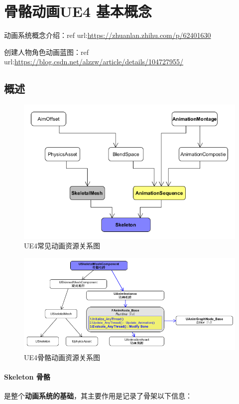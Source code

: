 \documentclass[UTF8,a4paper,12pt]{ctexbook}
\begin{document}
	\section{骨骼动画UE4 基本概念}
			动画系统概念介绍：ref url:\url{https://zhuanlan.zhihu.com/p/62401630}
			
			创建人物角色动画蓝图：ref url:\url{https://blog.csdn.net/alzzw/article/details/104727955/}
			
		\subsection{概述}
			\begin{figure}[H]
				\centering
				\includegraphics[width=.9\linewidth]{Anim_datas}
				\caption{UE4常见动画资源关系图}
			\end{figure}


			\begin{figure}[H]
				\centering
				\includegraphics[width=.9\linewidth]{Anim_datas01}
				\caption{UE4骨骼动画资源关系图}
			\end{figure}		
		
			\paragraph{Skeleton 骨骼}
				是整个\textbf{动画系统的基础}，其主要作用是记录了骨架以下信息：
				
\end{document}
